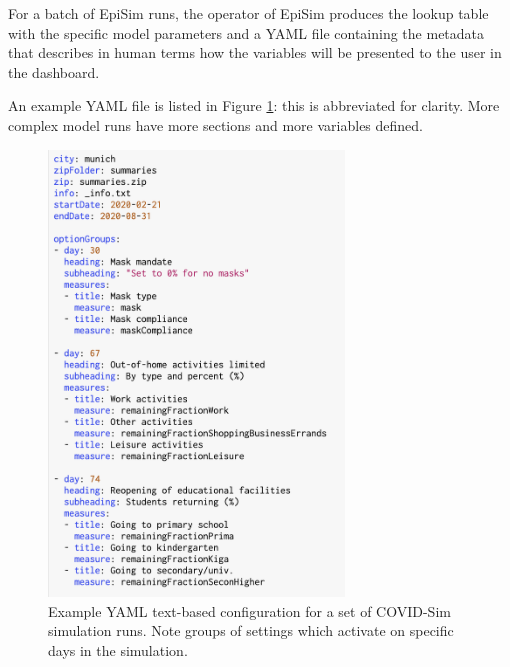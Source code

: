 For a batch of EpiSim runs, the operator of EpiSim produces the lookup table with the specific model parameters and a YAML file containing the metadata that describes in human terms how the variables will be presented to the user in the dashboard.

An example YAML file is listed in Figure \ref{fig:covid-yaml}: this is abbreviated for clarity. More complex model runs have more sections and more variables defined.

\begin{figure}
  \centering
	\begin{minipage}{0.9\textwidth}
    \centering
    \includegraphics[width=0.7\textwidth]{chapters/21-covid-sim/images/covid-yaml.png}
  \caption{Example YAML text-based configuration for a set of COVID-Sim simulation runs. Note groups of settings which activate on specific days in the simulation.}
  \label{fig:covid-yaml}
	\end{minipage}
\end{figure}


